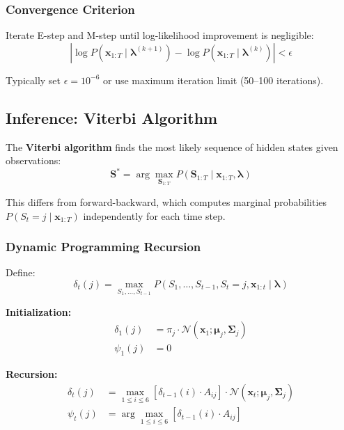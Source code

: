 \documentclass[11pt,a4paper]{article}
\newcommand{\bx}{\mathbf{x}}
\newcommand{\bmu}{\boldsymbol{\mu}}
\newcommand{\bSigma}{\boldsymbol{\Sigma}}
\newcommand{\blambda}{\boldsymbol{\lambda}}
\begin{document}
\subsubsection{Convergence Criterion}

Iterate E-step and M-step until log-likelihood improvement is negligible:
\begin{equation}
\left|\log P(\bx_{1:T} \mid \blambda^{(k+1)}) - \log P(\bx_{1:T} \mid \blambda^{(k)})\right| < \epsilon
\end{equation}

Typically set $\epsilon = 10^{-6}$ or use maximum iteration limit (50--100 iterations).

\subsection{Inference: Viterbi Algorithm}

The \textbf{Viterbi algorithm} finds the most likely sequence of hidden states given observations:
\begin{equation}
\mathbf{S}^* = \arg\max_{\mathbf{S}_{1:T}} P(\mathbf{S}_{1:T} \mid \bx_{1:T}, \blambda)
\end{equation}

This differs from forward-backward, which computes marginal probabilities $P(S_t = j \mid \bx_{1:T})$ independently for each time step.

\subsubsection{Dynamic Programming Recursion}

Define:
\begin{equation}
\delta_t(j) = \max_{S_1, \ldots, S_{t-1}} P(S_1, \ldots, S_{t-1}, S_t = j, \bx_{1:t} \mid \blambda)
\end{equation}

\textbf{Initialization:}
\begin{align}
\delta_1(j) &= \pi_j \cdot \mathcal{N}(\bx_1; \bmu_j, \bSigma_j) \\
\psi_1(j) &= 0
\end{align}

\textbf{Recursion:}
\begin{align}
\delta_t(j) &= \max_{1 \leq i \leq 6} \left[\delta_{t-1}(i) \cdot A_{ij}\right] \cdot \mathcal{N}(\bx_t; \bmu_j, \bSigma_j) \\
\psi_t(j) &= \arg\max_{1 \leq i \leq 6} \left[\delta_{t-1}(i) \cdot A_{ij}\right]
\end{align}
\end{document}
